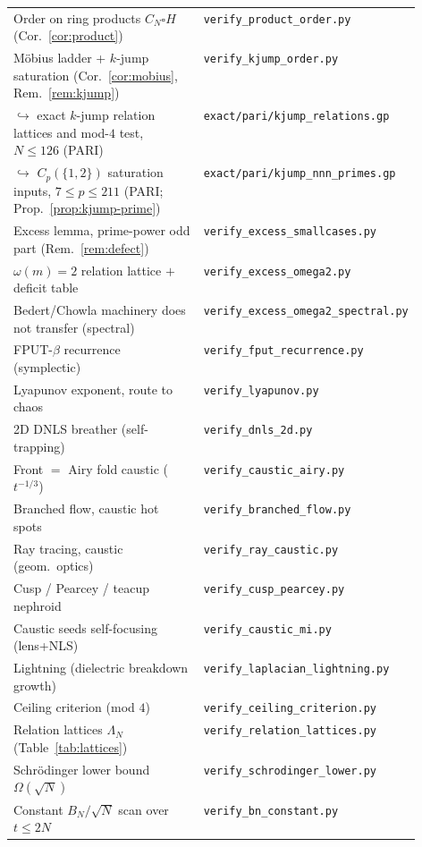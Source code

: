 \begin{longtable}{@{}p{0.53\linewidth}@{\hspace{0.6em}}l@{}}
Order on ring products $C_N\square H$ (Cor.~\ref{cor:product}) & \texttt{verify\_product\_order.py}\\
M\"obius ladder + $k$-jump saturation (Cor.~\ref{cor:mobius}, Rem.~\ref{rem:kjump}) & \texttt{verify\_kjump\_order.py}\\
\quad$\hookrightarrow$ exact $k$-jump relation lattices and mod-$4$ test, $N\le126$ (PARI) & \texttt{exact/pari/kjump\_relations.gp}\\
\quad$\hookrightarrow$ $C_p(\{1,2\})$ saturation inputs, $7\le p\le211$ (PARI; Prop.~\ref{prop:kjump-prime}) & \texttt{exact/pari/kjump\_nnn\_primes.gp}\\
Excess lemma, prime-power odd part (Rem.~\ref{rem:defect}) & \texttt{verify\_excess\_smallcases.py}\\
$\omega(m){=}2$ relation lattice $+$ deficit table & \texttt{verify\_excess\_omega2.py}\\
Bedert/Chowla machinery does not transfer (spectral) & \texttt{verify\_excess\_omega2\_spectral.py}\\
FPUT-$\beta$ recurrence (symplectic) & \texttt{verify\_fput\_recurrence.py}\\
Lyapunov exponent, route to chaos & \texttt{verify\_lyapunov.py}\\
2D DNLS breather (self-trapping) & \texttt{verify\_dnls\_2d.py}\\
Front $=$ Airy fold caustic ($t^{-1/3}$) & \texttt{verify\_caustic\_airy.py}\\
Branched flow, caustic hot spots & \texttt{verify\_branched\_flow.py}\\
Ray tracing, caustic (geom.\ optics) & \texttt{verify\_ray\_caustic.py}\\
Cusp / Pearcey / teacup nephroid & \texttt{verify\_cusp\_pearcey.py}\\
Caustic seeds self-focusing (lens+NLS) & \texttt{verify\_caustic\_mi.py}\\
Lightning (dielectric breakdown growth) & \texttt{verify\_laplacian\_lightning.py}\\
Ceiling criterion (mod $4$) & \texttt{verify\_ceiling\_criterion.py}\\
Relation lattices $\Lambda_N$ (Table~\ref{tab:lattices}) & \texttt{verify\_relation\_lattices.py}\\
Schr\"odinger lower bound $\Omega(\sqrt N)$ & \texttt{verify\_schrodinger\_lower.py}\\
Constant $B_N/\sqrt N$ scan over $t\le2N$ & \texttt{verify\_bn\_constant.py}\\

\end{longtable}
